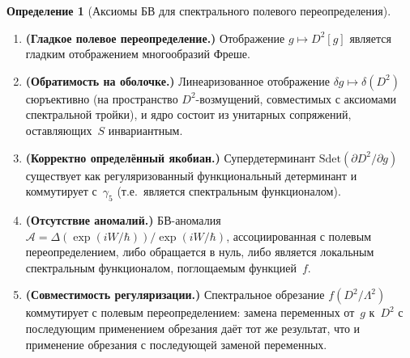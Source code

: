 \documentclass[12pt,a4paper]{article}
\theoremstyle{definition}
\newtheorem{definition}[theorem]{Определение}
\theoremstyle{remark}
\newcommand{\Lam}{\Lambda}
\begin{document}
\begin{definition}[Аксиомы БВ для спектрального полевого переопределения]
\label{def:bv_axioms}
\mbox{}
\begin{enumerate}[\bfseries BV-1:]
  \item \textbf{(Гладкое полевое переопределение.)}
    Отображение $g \mapsto D^2[g]$ является гладким отображением
    многообразий Фреше.
  \item \textbf{(Обратимость на оболочке.)}
    Линеаризованное отображение $\delta g \mapsto \delta(D^2)$
    сюръективно (на пространство $D^2$-возмущений, совместимых с
    аксиомами спектральной тройки), и ядро состоит из унитарных
    сопряжений, оставляющих~$S$ инвариантным.
  \item \textbf{(Корректно определённый якобиан.)}
    Супердетерминант $\mathrm{Sdet}(\partial D^2 / \partial g)$
    существует как регуляризованный функциональный детерминант и
    коммутирует с~$\gamma_5$ (т.е.\ является спектральным
    функционалом).
  \item \textbf{(Отсутствие аномалий.)}
    БВ-аномалия $\mathcal{A} = \Delta(\exp(iW/\hbar))/\exp(iW/\hbar)$,
    ассоциированная с полевым переопределением, либо обращается в нуль,
    либо является локальным спектральным функционалом, поглощаемым
    функцией~$f$.
  \item \textbf{(Совместимость регуляризации.)}
    Спектральное обрезание $f(D^2/\Lam^2)$ коммутирует с полевым
    переопределением: замена переменных от~$g$ к~$D^2$ с последующим
    применением обрезания даёт тот же результат, что и применение
    обрезания с последующей заменой переменных.
\end{enumerate}
\end{definition}
\end{document}
